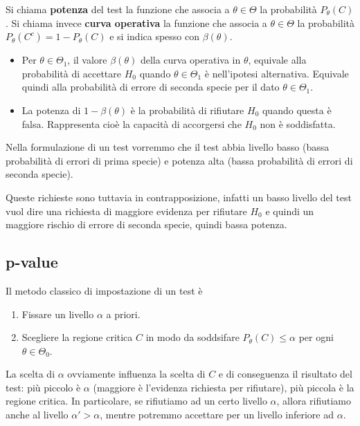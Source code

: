 \begin{definition}
	Si chiama \textbf{potenza} del test la funzione che associa a $\theta \in \Theta$ la
	probabilità $P_\theta(C)$. Si chiama invece \textbf{curva operativa} la funzione che associa
	a $\theta \in \Theta$ la probabilità $P_\theta (C^c) = 1 - P_\theta(C)$ e si indica spesso con
	$\beta(\theta)$.
	\begin{itemize}
		\item Per $\theta \in \Theta_1$, il valore $\beta(\theta)$ della curva operativa in
		      $\theta$, equivale alla probabilità di accettare $H_0$ quando $\theta \in \Theta_1$
		      è nell'ipotesi alternativa. Equivale quindi alla probabilità di errore di seconda
		      specie per il dato $\theta \in \Theta_1$.
		\item La potenza di $1 - \beta(\theta)$ è la probabilità di rifiutare $H_0$ quando questa
		      è falsa. Rappresenta cioè la capacità di accorgersi che $H_0$ non è soddisfatta.
	\end{itemize}
\end{definition}

Nella formulazione di un test vorremmo che il test abbia livello basso (bassa probabilità di errori
di prima specie) e potenza alta (bassa probabilità di errori di seconda specie).

Queste richieste sono tuttavia in contrapposizione, infatti un basso livello del test vuol dire una
richiesta di maggiore evidenza per rifiutare $H_0$ e quindi un maggiore rischio di errore di
seconda specie, quindi bassa potenza.

\subsection{p-value}
Il metodo classico di impostazione di un test è
\begin{enumerate}
	\item Fissare un livello $\alpha$ a priori.
	\item Scegliere la regione critica $C$ in modo da soddsifare $P_\theta(C) \leq \alpha$ per ogni
	      $\theta \in \Theta_0$.
\end{enumerate}
La scelta di $\alpha$ ovviamente influenza la scelta di $C$ e di conseguenza il risultato del test:
più piccolo è $\alpha$ (maggiore è l'evidenza richiesta per rifiutare), più piccola è la regione
critica. In particolare, se rifiutiamo ad un certo livello $\alpha$, allora rifiutiamo anche al
livello $\alpha' > \alpha$, mentre potremmo accettare per un livello inferiore ad $\alpha$.

